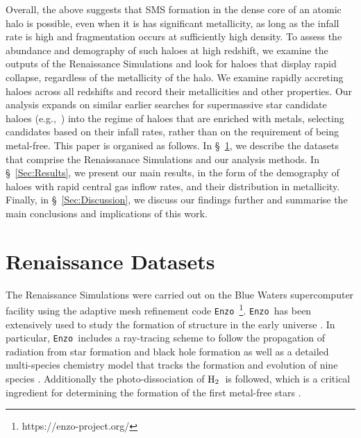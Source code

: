 \documentclass[graphics, twocolumn, usenatbib]{mn2e}
\newcommand{\enzo}{\texttt{Enzo~}}
\newcommand{\molH} {$\rm{H_2}$~}
\begin{document}
Overall, the above suggests that SMS formation in the dense core of an atomic halo is possible, even when it is has significant metallicity, as long as the infall rate is high and fragmentation occurs at sufficiently high density.  
To assess the abundance and demography of such haloes at high redshift, we examine the outputs of the Renaissance Simulations
and look for haloes that display rapid collapse, regardless of the metallicity of the halo.
We examine rapidly accreting haloes across all redshifts and record their metallicities and other properties.
Our analysis expands on similar earlier searches for supermassive star candidate haloes
(e.g.,~\citealt{Habouzit_2016,Wise_2019,Regan_2020}) into the regime of haloes that are enriched with
metals, selecting candidates based on their infall rates, rather than on the requirement of being metal-free.
This paper is organised as follows.
In \S~\ref{Sec:RenaissanceDatasets}, we describe the datasets that comprise the Renaissanace Simulations
and our analysis methods.
In \S~\ref{Sec:Results}, we present  our main results, in the form of the demography of
haloes with rapid central gas inflow rates, and their distribution in metallicity.  
Finally, in \S~\ref{Sec:Discussion}, 
we discuss our findings further and summarise the main conclusions and implications of this work.

\section{Renaissance Datasets} \label{Sec:RenaissanceDatasets}
The Renaissance Simulations were carried out on the Blue Waters supercomputer facility using the
adaptive mesh refinement code \enzo\citep{Enzo_2014, Enzo_2019}\footnote{https://enzo-project.org/}.
\enzo has been extensively used to study the formation of structure in the early universe
\citep{Abel_2002, OShea_2005b, Turk_2012, Wise_2012b, Wise_2014, Regan_2015, Regan_2017}. In
particular, \enzo includes a ray-tracing scheme to follow the propagation of radiation from star
formation and
black hole formation \citep{WiseAbel_2011} as well as a detailed multi-species chemistry model that
tracks the formation and evolution of nine species \citep{Anninos_1997, Abel_1997, Grackle}.
Additionally the photo-dissociation of \molH is followed, which is a critical ingredient for
determining the formation of the first metal-free stars \citep{Abel_2000}. 
\end{document}
